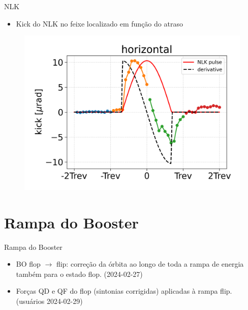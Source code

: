 \documentclass{beamer}					  %
\begin{document}
\begin{frame}{NLK}
    \vspace{0.2 cm}
    \begin{itemize}
            \item Kick do NLK no feixe localizado em função do atraso
    \end{itemize}
        \begin{figure}[H]
            \centering
            \includegraphics[width=1\textwidth]{2024-03-08/figures/hcoil-kick.png}
            \label{fig:hcoil-distortion}
        \end{figure}
\end{frame}


\section{Rampa do Booster}

\begin{frame}{Rampa do Booster}
    \vspace{0.4 cm}
    \large{
    \begin{itemize}
            \item BO flop $\rightarrow$ flip: correção da órbita ao longo de toda a rampa de energia também para o estado flop. (2024-02-27) \vspace{0.5cm}
            \item Forças QD e QF do flop (sintonias corrigidas) aplicadas à rampa flip. (usuários 2024-02-29)
    \end{itemize}
    }
\end{frame}
\end{document}
